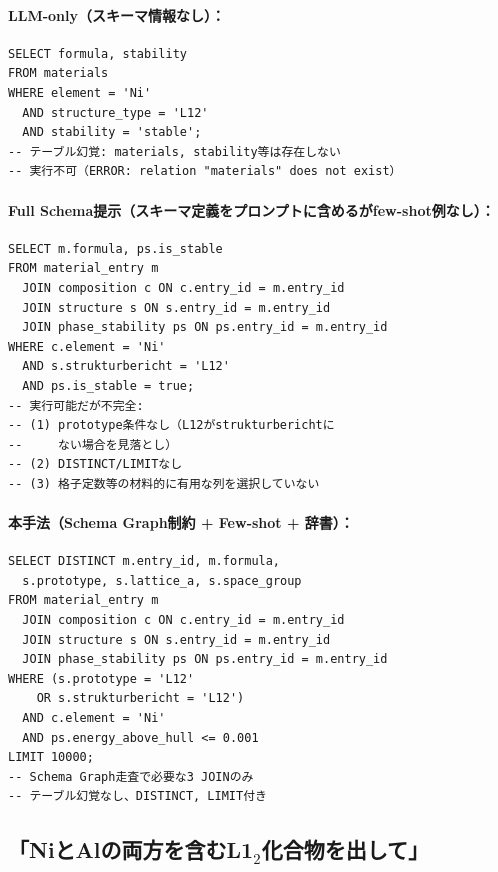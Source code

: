 \documentclass[5p,twocolumn]{elsarticle}
\begin{document}
\paragraph{LLM-only（スキーマ情報なし）：}
\begin{lstlisting}[basicstyle=\ttfamily\scriptsize,breaklines=true]
SELECT formula, stability
FROM materials
WHERE element = 'Ni'
  AND structure_type = 'L12'
  AND stability = 'stable';
-- テーブル幻覚: materials, stability等は存在しない
-- 実行不可（ERROR: relation "materials" does not exist）
\end{lstlisting}

\paragraph{Full Schema提示（スキーマ定義をプロンプトに含めるがfew-shot例なし）：}
\begin{lstlisting}[basicstyle=\ttfamily\scriptsize,breaklines=true]
SELECT m.formula, ps.is_stable
FROM material_entry m
  JOIN composition c ON c.entry_id = m.entry_id
  JOIN structure s ON s.entry_id = m.entry_id
  JOIN phase_stability ps ON ps.entry_id = m.entry_id
WHERE c.element = 'Ni'
  AND s.strukturbericht = 'L12'
  AND ps.is_stable = true;
-- 実行可能だが不完全:
-- (1) prototype条件なし（L12がstrukturberichtに
--     ない場合を見落とし）
-- (2) DISTINCT/LIMITなし
-- (3) 格子定数等の材料的に有用な列を選択していない
\end{lstlisting}

\paragraph{本手法（Schema Graph制約 + Few-shot + 辞書）：}
\begin{lstlisting}[basicstyle=\ttfamily\scriptsize,breaklines=true]
SELECT DISTINCT m.entry_id, m.formula,
  s.prototype, s.lattice_a, s.space_group
FROM material_entry m
  JOIN composition c ON c.entry_id = m.entry_id
  JOIN structure s ON s.entry_id = m.entry_id
  JOIN phase_stability ps ON ps.entry_id = m.entry_id
WHERE (s.prototype = 'L12'
    OR s.strukturbericht = 'L12')
  AND c.element = 'Ni'
  AND ps.energy_above_hull <= 0.001
LIMIT 10000;
-- Schema Graph走査で必要な3 JOINのみ
-- テーブル幻覚なし、DISTINCT, LIMIT付き
\end{lstlisting}

\subsection{「NiとAlの両方を含むL1$_2$化合物を出して」}
\end{document}
